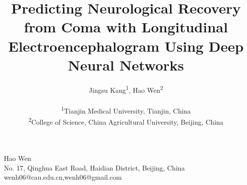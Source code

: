 \documentclass[twocolumn]{cinc}
\title{Predicting Neurological Recovery from Coma with Longitudinal Electroencephalogram Using Deep Neural Networks}
\author{Jingsu Kang\textsuperscript{1},
Hao Wen\textsuperscript{2} \\ \ \\
\textsuperscript{1}Tianjin Medical University, Tianjin, China\\
\textsuperscript{2}College of Science, China Agricultural University, Beijing, China
}
\begin{document}
\maketitle




















% 


\begin{correspondence}
Hao Wen\\
No. 17, Qinghua East Road, Haidian District, Beijing, China\\
wenh06@cau.edu.cn,wenh06@gmail.com
\end{correspondence}

\balance
\end{document}
